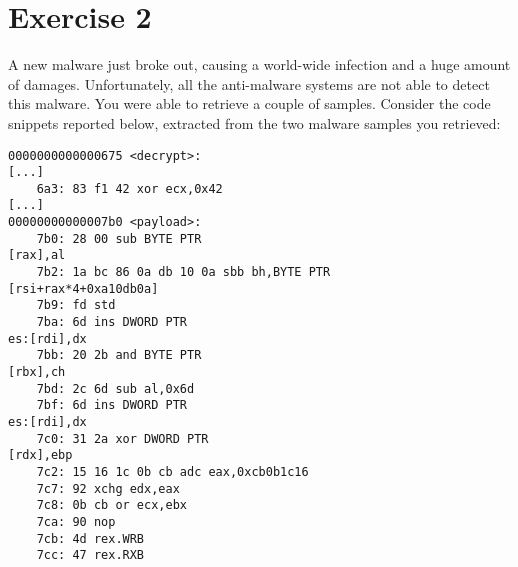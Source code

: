 \section{Exercise 2}

A new malware just broke out, causing a world-wide infection and a huge amount of damages. 
Unfortunately, all the anti-malware systems are not able to detect this malware. 
You were able to retrieve a couple of samples.
Consider the code snippets reported below, extracted from the two malware samples you retrieved:
\begin{verbatim}
0000000000000675 <decrypt>:
[...]
    6a3: 83 f1 42 xor ecx,0x42
[...]
00000000000007b0 <payload>:
    7b0: 28 00 sub BYTE PTR
[rax],al
    7b2: 1a bc 86 0a db 10 0a sbb bh,BYTE PTR
[rsi+rax*4+0xa10db0a]
    7b9: fd std
    7ba: 6d ins DWORD PTR
es:[rdi],dx
    7bb: 20 2b and BYTE PTR
[rbx],ch
    7bd: 2c 6d sub al,0x6d
    7bf: 6d ins DWORD PTR
es:[rdi],dx
    7c0: 31 2a xor DWORD PTR
[rdx],ebp
    7c2: 15 16 1c 0b cb adc eax,0xcb0b1c16
    7c7: 92 xchg edx,eax
    7c8: 0b cb or ecx,ebx
    7ca: 90 nop
    7cb: 4d rex.WRB
    7cc: 47 rex.RXB
\end{verbatim}

